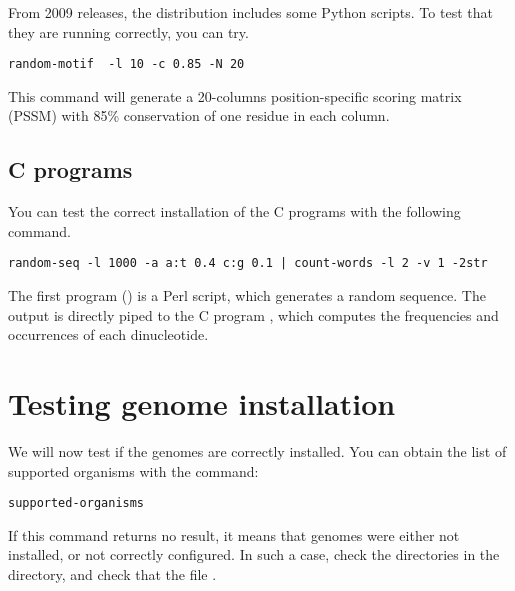 \documentclass{book}
\begin{document}
From 2009 releases, the \RSAT distribution includes some Python
scripts. To test that they are running correctly, you can try.

\begin{footnotesize}
\begin{verbatim}
random-motif  -l 10 -c 0.85 -N 20
\end{verbatim}
\end{footnotesize}

This command will generate a 20-columns position-specific scoring
matrix (PSSM) with 85\% conservation of one residue in each column.

\subsection{C programs}

You can test the correct installation of the C programs with the
following command.

\begin{footnotesize}
\begin{verbatim}
random-seq -l 1000 -a a:t 0.4 c:g 0.1 | count-words -l 2 -v 1 -2str
\end{verbatim}
\end{footnotesize}

The first program () is a Perl script, which
generates a random sequence. The output is directly piped to the C
program , which computes the frequencies and
occurrences of each dinucleotide.

\section{Testing genome installation}

We will now test if the genomes are correctly installed. You can
obtain the list of supported organisms with the command:

\begin{footnotesize}
\begin{verbatim}
supported-organisms
\end{verbatim}
\end{footnotesize}


If this command returns no result, it means that genomes were either
not installed, or not correctly configured. In such a case, check the
directories in the  directory, and check that the
file .
\end{document}
